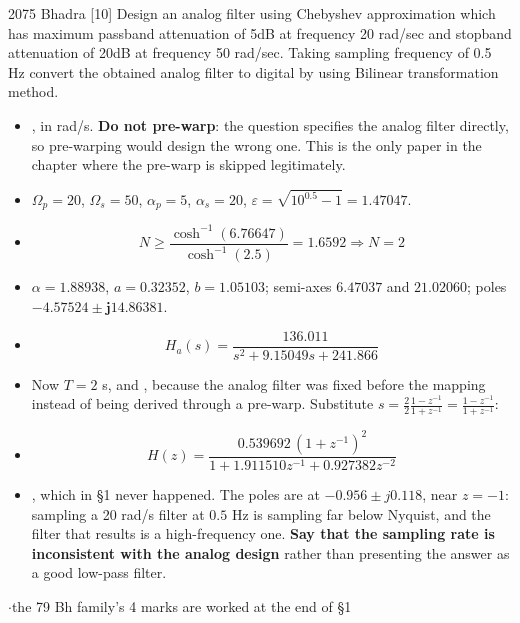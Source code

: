  {\color{sub}\footnotesize {}}
\begin{asked}{2075 Bhadra \textperiodcentered{} [10]}
Design an analog filter using Chebyshev approximation which has maximum passband
attenuation of 5dB at frequency 20 rad/sec and stopband attenuation of 20dB at frequency
50 rad/sec. Taking sampling frequency of 0.5 Hz convert the obtained analog filter to
digital by using Bilinear transformation method.
\end{asked}
\begin{itemize}
  \item {}, in rad/s. \textbf{Do not pre-warp}: the
        question specifies the analog filter directly, so pre-warping would design the
        wrong one. This is the only paper in the chapter where the pre-warp is skipped
        legitimately.
  \item $\Omega_p=20$, $\Omega_s=50$, $\alpha_p=5$, $\alpha_s=20$,
        $\varepsilon=\sqrt{10^{0.5}-1}=\mathbf{1.47047}$.
  \item[] \[ N\ge\frac{\cosh^{-1}(6.76647)}{\cosh^{-1}(2.5)}=1.6592
             \Rightarrow\boxed{N=2} \]
  \item $\alpha=1.88938$, $a=0.32352$, $b=1.05103$; semi-axes $6.47037$ and $21.02060$;
        poles $\mathbf{-4.57524\pm j14.86381}$.
  \item[] \[ H_a(s)=\frac{136.011}{s^2+9.15049s+241.866} \]
  \item Now $T=2$ s, and , because the analog filter was
        fixed before the mapping instead of being derived through a pre-warp. Substitute
        $s=\frac{2}{2}\frac{1-z^{-1}}{1+z^{-1}}=\frac{1-z^{-1}}{1+z^{-1}}$:
  \item[] \[ H(z)=\frac{0.539692\,(1+z^{-1})^2}{1+1.911510z^{-1}+0.927382z^{-2}} \]
  \item {}, which in \S1 never happened.
        The poles are at $-0.956\pm j0.118$, near $z=-1$: sampling a 20 rad/s filter at
        $0.5$ Hz is sampling far below Nyquist, and the filter that results is a
        high-frequency one. \textbf{Say that the sampling rate is inconsistent with the
        analog design} rather than presenting the answer as a good low-pass filter.
\end{itemize}

\hr

{\color{sub}\footnotesize {} 
\gap$\cdot$\gap the 79 Bh family's 4 marks are worked at the end of \S1}

